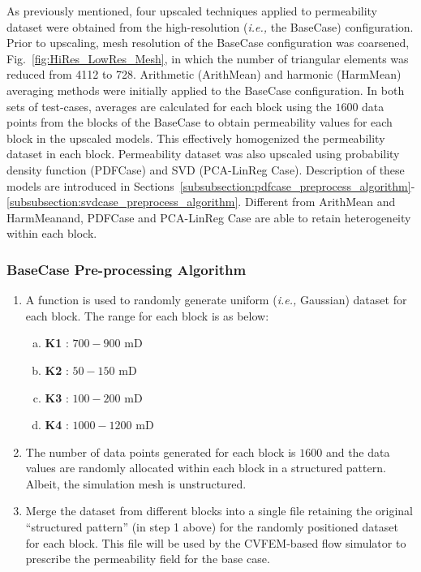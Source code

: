 \documentclass[preprint,12pt]{elsarticle}
\newcommand{\ie}{{\it i.e., }}
\begin{document}
As previously mentioned, four upscaled techniques applied to permeability dataset were obtained from the high-resolution (\ie the BaseCase) configuration. Prior to upscaling, mesh resolution of the BaseCase configuration was coarsened, Fig.~\ref{fig:HiRes_LowRes_Mesh}, in which the number of triangular elements was reduced from 4112 to 728. Arithmetic (ArithMean) and harmonic (HarmMean) averaging methods were initially applied to the BaseCase configuration. In both sets of test-cases, averages are calculated for each block using the $1600$ data points from the blocks of the BaseCase to obtain permeability values for each block in the upscaled models. This effectively homogenized the permeability dataset in each block. Permeability dataset was also upscaled using probability density function (PDFCase) and SVD (PCA-LinReg Case). Description of these models are introduced in Sections~\ref{subsubsection:pdfcase_preprocess_algorithm}-\ref{subsubsection:svdcase_preprocess_algorithm}. Different from ArithMean and HarmMeanand, PDFCase and PCA-LinReg Case are able to retain heterogeneity within each block.



\subsubsection{BaseCase Pre-processing Algorithm}\label{subsubsection:basecase_preprocess_algorithm}
\begin{enumerate}[1.]
  \item A function is used to randomly generate uniform (\ie Gaussian) dataset for each block. The range for each block is as below:
  \begin{enumerate}[a)]
    \item \textbf{K1} : $700 - 900$ mD
    \item \textbf{K2} : $50 - 150$ mD
    \item \textbf{K3} : $100 - 200$ mD
    \item \textbf{K4} : $1000 - 1200$ mD
  \end{enumerate}                                                    
  \item The number of data points generated for each block is $1600$ and the data values are randomly allocated within each block in a structured pattern. Albeit, the simulation mesh is unstructured.
  \item Merge the dataset from different blocks into a single file retaining the original ``structured pattern'' (in step 1 above) for the randomly positioned dataset for each block. This file will be used by the CVFEM-based flow simulator to prescribe the permeability field for the base case.
\end{enumerate}
\end{document}
